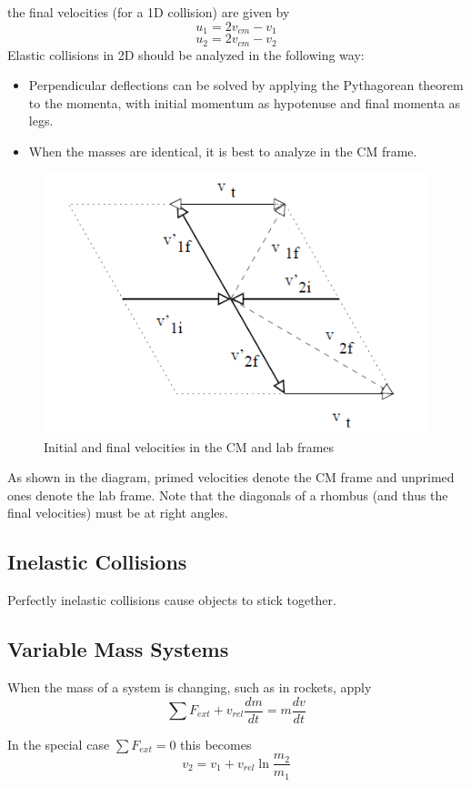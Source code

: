 \documentclass[../PhysicsFormulae.tex]{subfiles}
\begin{document}
the final velocities (for a 1D collision) are given by
\[u_1 = 2v_{cm} - v_1\]
\[u_2 = 2v_{cm} - v_2\]
Elastic collisions in 2D should be analyzed in the following way:
\begin{itemize}
    \item Perpendicular deflections can be solved by applying the Pythagorean theorem to the momenta, with initial momentum as hypotenuse and final momenta as legs. 
    \item When the masses are identical, it is best to analyze in the CM frame. 
\end{itemize}
\begin{figure}
    \centering
    \includegraphics[width=0.5\linewidth]{images/5.identical_mass_velocity_transform.png}
    \caption{Initial and final velocities in the CM and lab frames}
    \label{fig:vdiagram1}
\end{figure}
As shown in the diagram, primed velocities denote the CM frame and unprimed ones denote the lab frame. Note that the diagonals of a rhombus (and thus the final velocities) must be at right angles. 
\subsection{Inelastic Collisions}
Perfectly inelastic collisions cause objects to stick together. 

\subsection{Variable Mass Systems}
When the mass of a system is changing, such as in rockets, apply
\[\sum F_{ext} + v_{rel}\frac{dm}{dt} = m\frac{dv}{dt}\]

In the special case $\sum F_{ext} = 0$ this becomes
\[v_2 = v_1 + v_{rel}\ln{\frac{m_2}{m_1}}\]
\end{document}
